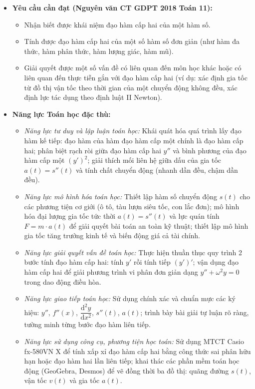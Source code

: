 \documentclass[12pt, a4paper]{article}
\begin{document}
\begin{itemize}[leftmargin=1.2cm]
    \item \textbf{Yêu cầu cần đạt (Nguyên văn CT GDPT 2018 Toán 11):}
    \begin{itemize}[leftmargin=0.6cm]
        \item Nhận biết được khái niệm đạo hàm cấp hai của một hàm số.
        \item Tính được đạo hàm cấp hai của một số hàm số đơn giản (như hàm đa thức, hàm phân thức, hàm lượng giác, hàm mũ).
        \item Giải quyết được một số vấn đề có liên quan đến môn học khác hoặc có liên quan đến thực tiễn gắn với đạo hàm cấp hai (ví dụ: xác định gia tốc từ đồ thị vận tốc theo thời gian của một chuyển động không đều, xác định lực tác dụng theo định luật II Newton).
    \end{itemize}

    \item \textbf{Năng lực Toán học đặc thù:}
    \begin{itemize}[leftmargin=0.6cm]
        \item \textit{Năng lực tư duy và lập luận toán học:} Khái quát hóa quá trình lấy đạo hàm kế tiếp: đạo hàm của hàm đạo hàm cấp một chính là đạo hàm cấp hai; phân biệt rạch ròi giữa đạo hàm cấp hai $y''$ và bình phương của đạo hàm cấp một $(y')^2$; giải thích mối liên hệ giữa dấu của gia tốc $a(t) = s''(t)$ và tính chất chuyển động (nhanh dần đều, chậm dần đều).
        \item \textit{Năng lực mô hình hóa toán học:} Thiết lập hàm số chuyển động $s(t)$ cho các phương tiện cơ giới (ô tô, tàu lượn siêu tốc, con lắc đơn); mô hình hóa đại lượng gia tốc tức thời $a(t) = s''(t)$ và lực quán tính $F = m \cdot a(t)$ để giải quyết bài toán an toàn kỹ thuật; thiết lập mô hình gia tốc tăng trưởng kinh tế và biến động giá cả tài chính.
        \item \textit{Năng lực giải quyết vấn đề toán học:} Thực hiện thuần thục quy trình 2 bước tính đạo hàm cấp hai: tính $y'$ rồi tính tiếp $(y')'$; vận dụng đạo hàm cấp hai để giải phương trình vi phân đơn giản dạng $y'' + \omega^2 y = 0$ trong dao động điều hòa.
        \item \textit{Năng lực giao tiếp toán học:} Sử dụng chính xác và chuẩn mực các ký hiệu: $y''$, $f''(x)$, $\dfrac{\mathrm{d}^2 y}{\mathrm{d}x^2}$, $s''(t)$, $a(t)$; trình bày bài giải tự luận rõ ràng, tường minh từng bước đạo hàm liên tiếp.
        \item \textit{Năng lực sử dụng công cụ, phương tiện học toán:} Sử dụng MTCT Casio fx-580VN X để tính xấp xỉ đạo hàm cấp hai bằng công thức sai phân hữu hạn hoặc đạo hàm hai lần liên tiếp; khai thác các phần mềm toán học động (GeoGebra, Desmos) để vẽ đồng thời ba đồ thị: quãng đường $s(t)$, vận tốc $v(t)$ và gia tốc $a(t)$.
    \end{itemize}


\end{itemize}
\end{document}
